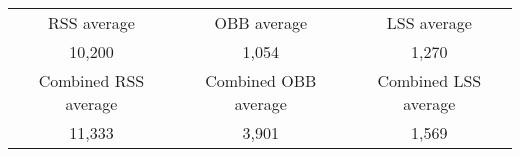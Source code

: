 \begin{tabular}{c|c|c}\\ 
RSS average & OBB average & LSS average\\ 
10,200 & 1,054 & 1,270\\ 
\hline 
Combined RSS average & Combined OBB average & Combined LSS average\\ 
11,333 & 3,901 & 1,569\\ 
\end{tabular}